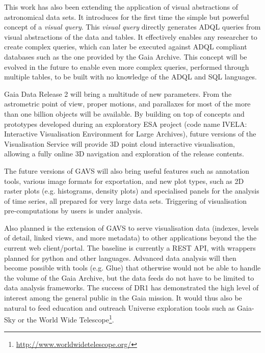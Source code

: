 \documentclass[longauth, final]{aa}
\begin{document}
This work has also been extending the application of visual abstractions of astronomical data sets. It introduces for the first time the simple but powerful concept of a {\it visual query}. This {\it visual query}  directly generates ADQL queries from visual abstractions of the data and tables. It effectively enables any researcher to create complex queries, which can later be executed against ADQL compliant databases such as the one provided by the Gaia Archive. This concept will be evolved in the future to enable even more complex queries, performed through multiple tables, to be built with no knowledge of the ADQL and SQL languages. 

Gaia Data Release 2 will bring a multitude of new parameters. From the astrometric point of view, proper motions, and parallaxes for most of the more than one billion objects will be available. By building on top of concepts and prototypes developed during an exploratory ESA project (code name IVELA: Interactive Visualisation Environment for Large Archives), future versions of the Visualisation Service will provide 3D point cloud interactive visualisation, allowing a fully online 3D navigation and exploration of the release contents.

The future versions of GAVS will also bring useful features such as annotation tools,  various image formats for exportation, and new plot types, such as 2D raster plots (e.g. histograms, density plots) and specialised panels for the analysis of time series, all prepared for very large data sets. Triggering of visualisation pre-computations by users is under analysis. 

Also planned is the extension of GAVS to serve visualisation data (indexes, levels of detail, linked views, and more metadata) to other applications beyond the the current web client/portal. The baseline is currently a REST API, with wrappers planned for python and other languages.
Advanced data analysis will then become possible with tools (e.g. Glue) that otherwise would not be able to handle the volume of the Gaia Archive, but the data feeds do not have to be limited to data analysis frameworks. The success of DR1 has demonstrated the high level of  interest among the general public in the Gaia mission. It would thus also  be natural to  feed education and outreach Universe exploration tools such as Gaia-Sky or the World Wide Telescope\footnote{\url{http://www.worldwidetelescope.org/}}.
\end{document}

